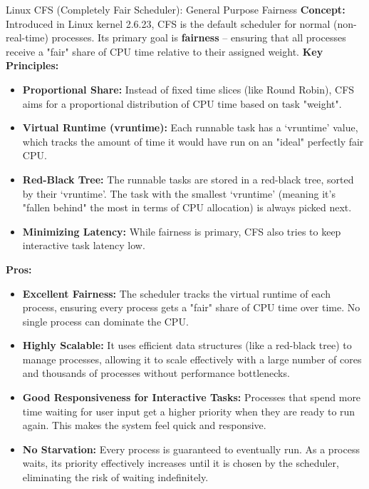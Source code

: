 \documentclass[aspectratio=169,11pt]{beamer}
\begin{document}
\iffalse
\begin{frame}[allowframebreaks]{Linux CFS (Completely Fair Scheduler): General Purpose Fairness}
  \small
  \textbf{Concept:} Introduced in Linux kernel 2.6.23, CFS is the default scheduler for normal (non-real-time) processes. Its primary goal is \textbf{fairness} – ensuring that all processes receive a "fair" share of CPU time relative to their assigned weight.
  \vspace{0.3cm}
  \textbf{Key Principles:}
  \begin{itemize}
    \item \textbf{Proportional Share:} Instead of fixed time slices (like Round Robin), CFS aims for a proportional distribution of CPU time based on task "weight".
    \item \textbf{Virtual Runtime (vruntime):} Each runnable task has a `vruntime' value, which tracks the amount of time it would have run on an "ideal" perfectly fair CPU.
    \item \textbf{Red-Black Tree:} The runnable tasks are stored in a red-black tree, sorted by their `vruntime'. The task with the smallest `vruntime' (meaning it's "fallen behind" the most in terms of CPU allocation) is always picked next.
    \item \textbf{Minimizing Latency:} While fairness is primary, CFS also tries to keep interactive task latency low.
  \end{itemize}

  \textbf{\textcolor{green!50!black}{Pros:}}
    \begin{itemize}
    \item \textbf{Excellent Fairness:} The scheduler tracks the virtual runtime of each process, ensuring every process gets a "fair" share of CPU time over time. No single process can dominate the CPU.
    \item \textbf{Highly Scalable:} It uses efficient data structures (like a red-black tree) to manage processes, allowing it to scale effectively with a large number of cores and thousands of processes without performance bottlenecks.
    \item \textbf{Good Responsiveness for Interactive Tasks:} Processes that spend more time waiting for user input get a higher priority when they are ready to run again. This makes the system feel quick and responsive.
    \item \textbf{No Starvation:} Every process is guaranteed to eventually run. As a process waits, its priority effectively increases until it is chosen by the scheduler, eliminating the risk of waiting indefinitely.
\end{itemize}


\end{frame}
\end{document}

